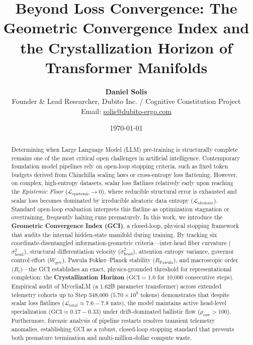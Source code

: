 \documentclass[11pt,twocolumn]{article}
\title{\textbf{Beyond Loss Convergence: The Geometric Convergence Index and the Crystallization Horizon of Transformer Manifolds}}
\author{\textbf{Daniel Solis} \\ \small Founder \& Lead Researcher, Dubito Inc. / Cognitive Constitution Project \\ \small Email: \href{mailto:solis@dubito-ergo.com}{solis@dubito-ergo.com}}
\date{\today}
\begin{document}
\maketitle

\begin{abstract}
Determining when Large Language Model (LLM) pre-training is structurally complete remains one of the most critical open challenges in artificial intelligence. Contemporary foundation model pipelines rely on open-loop stopping criteria, such as fixed token budgets derived from Chinchilla scaling laws or cross-entropy loss flattening. However, on complex, high-entropy datasets, scalar loss flatlines relatively early upon reaching the \textit{Epistemic Floor} ($\mathcal{L}_{\text{epistemic}} \to 0$), where reducible structural error is exhausted and scalar loss becomes dominated by irreducible aleatoric data entropy ($\mathcal{L}_{\text{aleatoric}}$). Standard open-loop evaluation interprets this flatline as optimization stagnation or overtraining, frequently halting runs prematurely. In this work, we introduce the \textbf{Geometric Convergence Index (GCI)}, a closed-loop, physical stopping framework that audits the internal hidden-state manifold during training. By tracking six coordinate-disentangled information-geometric criteria—inter-head fiber curvature ($\sigma^2_{\text{head}}$), structural differentiation velocity ($\dot{\sigma}^2_{\text{head}}$), attention entropy variance, governor control effort ($\dot{W}_{\text{gov}}$), Pawula Fokker--Planck stability ($R_{\text{Pawula}}$), and macroscopic order ($R_t$)—the GCI establishes an exact, physics-grounded threshold for representational completion: the \textbf{Crystallization Horizon} ($\text{GCI} = 1.0$ for 10,000 consecutive steps). Empirical audit of MyceliaLM (a 1.62B parameter transformer) across extended telemetry cohorts up to Step 348,000 ($5.70 \times 10^9$ tokens) demonstrates that despite scalar loss flatlines ($\mathcal{L}_{\text{total}} \approx 7.6 - 7.8$ nats), the model maintains active head-level specialization ($\text{GCI} \approx 0.17 - 0.33$) under drift-dominated ballistic flow ($\rho_{\text{raw}} > 100$). Furthermore, forensic analysis of pipeline restarts resolves transient telemetry anomalies, establishing GCI as a robust, closed-loop stopping standard that prevents both premature termination and multi-million-dollar compute waste.
\end{abstract}
\end{document}
